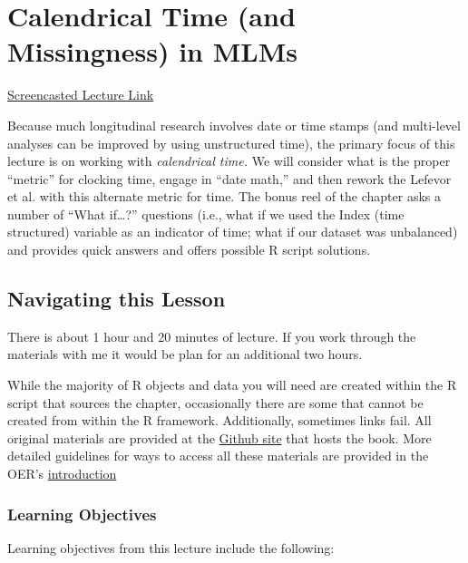 \documentclass[
  11pt,
]{book}
\begin{document}
\hypertarget{TimeLord}{%
\chapter{Calendrical Time (and Missingness) in MLMs}\label{TimeLord}}

\href{https://spu.hosted.panopto.com/Panopto/Pages/Viewer.aspx?pid=5ea38416-c682-49f8-ba71-ad390025e36e}{Screencasted Lecture Link}

Because much longitudinal research involves date or time stamps (and multi-level analyses can be improved by using unstructured time), the primary focus of this lecture is on working with \emph{calendrical time.} We will consider what is the proper ``metric'' for clocking time, engage in ``date math,'' and then rework the Lefevor et al.\citeyearpar{lefevor_religious_2017} with this alternate metric for time. The bonus reel of the chapter asks a number of ``What if\ldots?'' questions (i.e., what if we used the Index (time structured) variable as an indicator of time; what if our dataset was unbalanced) and provides quick answers and offers possible R script solutions.

\hypertarget{navigating-this-lesson-3}{%
\section{Navigating this Lesson}\label{navigating-this-lesson-3}}

There is about 1 hour and 20 minutes of lecture. If you work through the materials with me it would be plan for an additional two hours.

While the majority of R objects and data you will need are created within the R script that sources the chapter, occasionally there are some that cannot be created from within the R framework. Additionally, sometimes links fail. All original materials are provided at the \href{https://github.com/lhbikos/ReC_CPA}{Github site} that hosts the book. More detailed guidelines for ways to access all these materials are provided in the OER's \protect\hyperlink{ReCintro}{introduction}

\hypertarget{learning-objectives-3}{%
\subsection{Learning Objectives}\label{learning-objectives-3}}

Learning objectives from this lecture include the following:
\end{document}
